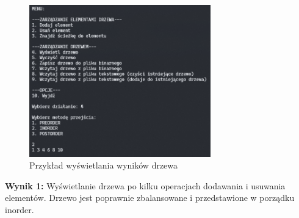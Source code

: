 \begin{figure}[ht]
	\centering
	\includegraphics[width=0.7\textwidth]{rys/display_bst.png}
	\caption{Przykład wyświetlania wyników drzewa}
\end{figure}

\textbf{Wynik 1:} Wyświetlanie drzewa po kilku operacjach dodawania i usuwania elementów. Drzewo jest poprawnie zbalansowane i przedstawione w porządku inorder.
